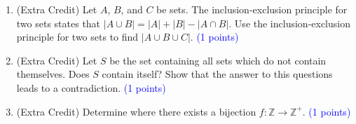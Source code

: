 \documentclass{article}
\newcommand{\pt}[1]{\textcolor{blue}{(#1 points)}}
\newenvironment{rubric}
{
\par
\begin{spacing}{.6}
\begin{itshape}
\color{red}

}
{
\end{itshape}
\end{spacing}
\par
}
\begin{document}
\begin{enumerate}
\begin{rubric}
-4, invalid pseudocode

-4, algorithm is slower than $O(n)$

-4, arithmetic error
\end{rubric}

\item (Extra Credit) Let $A$, $B$, and $C$ be sets. The inclusion-exclusion principle for two sets states that $|A \cup B| = |A| + |B| - |A \cap B|$. Use the inclusion-exclusion principle for two sets to find $|A \cup B \cup C|.$ \pt{1}

\item (Extra Credit) Let $S$ be the set containing all sets which do not contain themselves. Does $S$ contain itself? Show that the answer to this questions leads to a contradiction. \pt{1}

\item (Extra Credit) Determine where there exists a bijection $f : \mathbb{Z} \rightarrow \mathbb{Z}^+$. \pt{1}

\end{enumerate}
\end{document}
